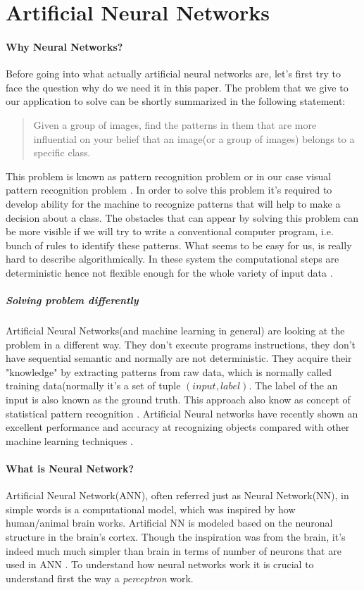 \section{Artificial Neural Networks}
\paragraph{Why Neural Networks?}
\label{sec:neural_networks}
Before going into what actually artificial neural networks are, let's first
try to face the question why do we need it in this paper. The problem that
we give to our application to solve can be shortly summarized in the following statement:
\blockquote{
Given a group of images, find the patterns in them that are more influential
on your belief that an image(or a group of images) belongs to a specific class.
}


This problem is known as pattern recognition problem or in our case
visual pattern recognition problem \cite{Bishop1995}.
In order to solve this problem it's required to develop ability for the machine
to recognize patterns that will help to make a decision about a class.
The obstacles that can appear by solving this problem can be more visible
if we will try to write a conventional computer program, i.e. bunch of rules
to identify these patterns. What seems to be easy for us, is really hard to describe
algorithmically. In these system the computational steps are deterministic
hence not flexible enough for the whole variety of input data \cite{Nielsen2015}.

\subparagraph{Solving problem differently}
Artificial Neural Networks(and machine learning in general) are looking at the problem
in a different way.
They don't execute programs instructions, they don't have
sequential semantic and normally are not
deterministic. They acquire their "knowledge" by extracting patterns from raw data,
which is normally called training data(normally it's a set of tuple $(input, label)$.
The label of the an input is also known as the ground truth.
This approach also know as concept of statistical pattern recognition \cite{Bishop1995}.
Artificial Neural networks have recently shown an excellent performance and
accuracy at recognizing objects compared with other
machine learning techniques \cite{Krizhevsky2012}.

\paragraph{What is Neural Network?}
Artificial Neural Network(ANN), often referred just as Neural Network(NN),
in simple words is a computational model, which was inspired by how human/animal
brain works. Artificial \gls{NN} is modeled based on the neuronal structure in the brain's
cortex. Though the inspiration was from the brain,
it's indeed much much simpler than brain in terms of number of neurons that are used
in ANN \cite{Goodfellow-et-al-2016}.
To understand how neural networks work it is crucial to understand first the
way a \emph{perceptron} work.

